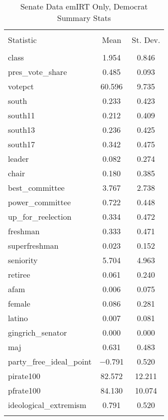 \documentclass[12pt]{article}
\begin{document}
\begin{table}[!htbp] \centering 
	\label{} 
	\begin{tabular}{@{\extracolsep{5pt}}lcc} 
		\\[-1.8ex]\hline 
		\hline \\[-1.8ex] 
		Statistic & \multicolumn{1}{c}{Mean} & \multicolumn{1}{c}{St. Dev.} \\ 
		\hline \\[-1.8ex] 
		class & 1.954 & 0.846 \\ 
		pres\_vote\_share & 0.485 & 0.093 \\ 
		votepct & 60.596 & 9.735 \\ 
		south & 0.233 & 0.423 \\ 
		south11 & 0.212 & 0.409 \\ 
		south13 & 0.236 & 0.425 \\ 
		south17 & 0.342 & 0.475 \\ 
		leader & 0.082 & 0.274 \\ 
		chair & 0.180 & 0.385 \\ 
		best\_committee & 3.767 & 2.738 \\ 
		power\_committee & 0.722 & 0.448 \\ 
		up\_for\_reelection & 0.334 & 0.472 \\ 
		freshman & 0.333 & 0.471 \\ 
		superfreshman & 0.023 & 0.152 \\ 
		seniority & 5.704 & 4.963 \\ 
		retiree & 0.061 & 0.240 \\ 
		afam & 0.006 & 0.075 \\ 
		female & 0.086 & 0.281 \\ 
		latino & 0.007 & 0.081 \\ 
		gingrich\_senator & 0.000 & 0.000 \\ 
		maj & 0.631 & 0.483 \\ 
		party\_free\_ideal\_point & $-$0.791 & 0.520 \\ 
		pirate100 & 82.572 & 12.211 \\ 
		pfrate100 & 84.130 & 10.074 \\ 
		ideological\_extremism & 0.791 & 0.520 \\ 
		\hline \\[-1.8ex] 
	\end{tabular} 
	\caption{Senate Data emIRT Only, Democrat Summary Stats} 
\end{table} 
\end{document}
